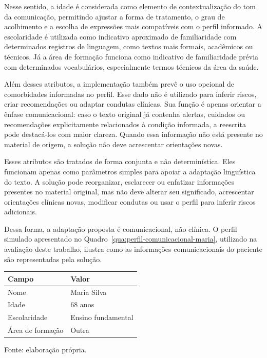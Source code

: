 Nesse sentido, a idade é considerada como elemento de contextualização do tom da comunicação, permitindo ajustar a forma de tratamento, o grau de acolhimento e a escolha de expressões mais compatíveis com o perfil informado. A escolaridade é utilizada como indicativo aproximado de familiaridade com determinados registros de linguagem, como textos mais formais, acadêmicos ou técnicos. Já a área de formação funciona como indicativo de familiaridade prévia com determinados vocabulários, especialmente termos técnicos da área da saúde.

Além desses atributos, a implementação também prevê o uso opcional de comorbidades informadas no perfil. Esse dado não é utilizado para inferir riscos, criar recomendações ou adaptar condutas clínicas. Sua função é apenas orientar a ênfase comunicacional: caso o texto original já contenha alertas, cuidados ou recomendações explicitamente relacionados à condição informada, a reescrita pode destacá-los com maior clareza. Quando essa informação não está presente no material de origem, a solução não deve acrescentar orientações novas.

Esses atributos são tratados de forma conjunta e não determinística. Eles funcionam apenas como parâmetros simples para apoiar a adaptação linguística do texto. A solução pode reorganizar, esclarecer ou enfatizar informações presentes no material original, mas não deve alterar seu significado, acrescentar orientações clínicas novas, modificar condutas ou usar o perfil para inferir riscos adicionais.

Dessa forma, a adaptação proposta é comunicacional, não clínica. O perfil simulado apresentado no Quadro~\ref{qua:perfil-comunicacional-maria}, utilizado na avaliação deste trabalho, ilustra como as informações comunicacionais do paciente são representadas pela solução.

\begin{quadro}[htbp]
  \centering
  \caption{Exemplo de perfil comunicacional utilizado pela solução.}
  \label{qua:perfil-comunicacional-maria}
  \small
  \renewcommand{\arraystretch}{1.2}

  \begin{tabularx}{0.82\textwidth}{p{} X}
    \toprule
    \textbf{Campo} & \textbf{Valor} \\
    \midrule
    Nome & Maria Silva \\
    Idade & 68 anos \\
    Escolaridade & Ensino fundamental \\
    Área de formação & Outra \\
    \bottomrule
  \end{tabularx}

  \vspace{0.3em}
  {\small Fonte: elaboração própria.}
\end{quadro}

